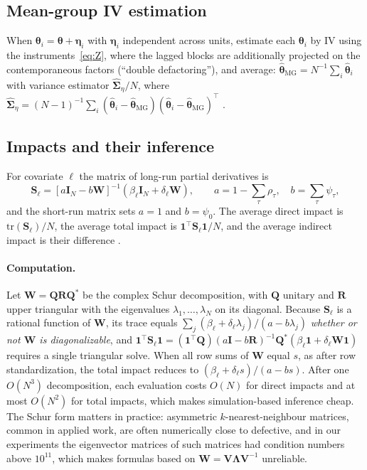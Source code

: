 \documentclass[article]{jss}
\begin{document}
\subsection{Mean-group IV estimation}

When $\bm\theta_i=\bm\theta+\bm\eta_i$ with $\bm\eta_i$ independent across
units, \citet{Chen+Cui+Sarafidis:2025} estimate each $\bm\theta_i$ by IV
using the instruments~\eqref{eq:Z}, where the lagged blocks are
additionally projected on the contemporaneous factors (``double
defactoring''), and average:
$\hat{\bm\theta}_{\mathrm{MG}} = N^{-1}\sum_i\hat{\bm\theta}_i$ with variance
estimator $\hat{\bm\Sigma}_\eta/N$, where
$\hat{\bm\Sigma}_\eta=(N-1)^{-1}\sum_i(\hat{\bm\theta}_i-\hat{\bm\theta}_{\mathrm{MG}})(\hat{\bm\theta}_i-\hat{\bm\theta}_{\mathrm{MG}})^\top$
\citep[see also][]{Pesaran+Smith:1995}.

\subsection{Impacts and their inference} \label{sec:impacts}

For covariate $\ell$ the matrix of long-run partial derivatives is
\begin{equation}
\bm S_\ell = \left[a\bm I_N - b\bm W\right]^{-1}(\beta_\ell\bm I_N+\delta_\ell\bm W),\qquad
a = 1-\textstyle\sum_\tau\rho_\tau,\quad b=\sum_\tau\psi_\tau,
\label{eq:S}
\end{equation}
and the short-run matrix sets $a=1$ and $b=\psi_0$. The average direct
impact is $\mathrm{tr}(\bm S_\ell)/N$, the average total impact is
$\bm 1^\top\bm S_\ell\bm 1/N$, and the average indirect impact is their
difference \citep{LeSage+Pace:2009,Debarsy+Ertur+LeSage:2012}.

\paragraph{Computation.} Let $\bm W=\bm Q\bm R\bm Q^*$ be the complex Schur
decomposition, with $\bm Q$ unitary and $\bm R$ upper triangular with the
eigenvalues $\lambda_1,\dots,\lambda_N$ on its diagonal. Because $\bm S_\ell$
is a rational function of $\bm W$, its trace equals
$\sum_j(\beta_\ell+\delta_\ell\lambda_j)/(a-b\lambda_j)$ \emph{whether or not
$\bm W$ is diagonalizable}, and
$\bm 1^\top\bm S_\ell\bm 1 = (\bm 1^\top\bm Q)(a\bm I-b\bm R)^{-1}\bm Q^*(\beta_\ell\bm 1+\delta_\ell\bm W\bm 1)$
requires a single triangular solve. When all row sums of $\bm W$ equal $s$,
as after row standardization, the total impact reduces to
$(\beta_\ell+\delta_\ell s)/(a-bs)$. After one $O(N^3)$ decomposition, each
evaluation costs $O(N)$ for direct impacts and at most $O(N^2)$ for total
impacts, which makes simulation-based inference cheap. The Schur form
matters in practice: asymmetric $k$-nearest-neighbour matrices, common in
applied work, are often numerically close to defective, and in our
experiments the eigenvector matrices of such matrices had condition numbers
above $10^{11}$, which makes formulas based on $\bm W=\bm V\bm\Lambda\bm V^{-1}$
unreliable.
\end{document}
